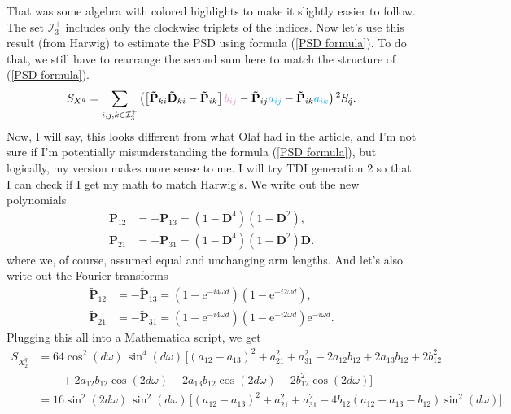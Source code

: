 \documentclass[11pt]{article}
\begin{document}
That was some algebra with  colored highlights to make it slightly easier to follow. The set $\mathcal{I}^+_3$ includes only the clockwise triplets of the indices. Now let's use this result (from Harwig) to estimate the PSD using formula (\ref{PSD formula}). To do that, we still have to rearrange the second sum here to match the structure of (\ref{PSD formula}).
\begin{equation*}
S_{X^q}=\sum_{i,j,k\in\mathcal{I}^+_3}\left(\left[\mathbf{\tilde{P}}_{ki}\mathbf{\tilde{D}}_{ki}-\mathbf{\tilde{P}}_{ik}\right]\color{Lavender}b_{ij}\color{black}-\mathbf{\tilde{P}}_{ij}\color{cyan}a_{ij}\color{black}-\mathbf{\tilde{P}}_{ik}\color{cyan}a_{ik}\color{black}\right)^2S_{\dot{q}}.
\end{equation*}
Now, I will say, this looks different from what Olaf had in the article, and I'm not sure if I'm potentially misunderstanding the formula (\ref{PSD formula}), but logically, my version makes more sense to me. I will try TDI generation 2 so that I can check if I get my math to match Harwig's. We write out the new polynomials 
\begin{align*}
\mathbf{P}_{12} &= -\mathbf{P}_{13} = \left(1-\mathbf{D}^4\right)\left(1-\mathbf{D}^2\right),\\[3pt]
\mathbf{P}_{21} &= -\mathbf{P}_{31} = \left(1-\mathbf{D}^4\right)\left(1-\mathbf{D}^2\right)\mathbf{D}.
\end{align*}
where we, of course, assumed equal and unchanging arm lengths. And let's also write out the Fourier transforms
\begin{align*}
    \tilde{\mathbf{P}}_{12} &= -\tilde{\mathbf{P}}_{13} = \left(1-\mathrm{e}^{-i4\omega d}\right)\left(1-\mathrm{e}^{-i2\omega d}\right),\\[3pt]
    \tilde{\mathbf{P}}_{21} &= -\tilde{\mathbf{P}}_{31} = \left(1-\mathrm{e}^{-i4\omega d}\right)\left(1-\mathrm{e}^{-i2\omega d}\right)\mathrm{e}^{-i\omega d}.
\end{align*}
Plugging this all into a Mathematica script, we get
\begin{align*}
S_{X_2^{\dot q}}
&= 64 \cos^{2}(d\omega)\,\sin^{4}(d\omega)\,
\Big[
   (a_{12}-a_{13})^2
 + a_{21}^{2}
 + a_{31}^{2}
 - 2 a_{12} b_{12}
 + 2 a_{13} b_{12}
 + 2 b_{12}^{2} \\
&\qquad
 + 2 a_{12} b_{12}\cos(2 d\omega)
 - 2 a_{13} b_{12}\cos(2 d\omega)
 - 2 b_{12}^{2}\cos(2 d\omega)
\Big] \\[6pt]
&= 16 \sin^{2}(2d\omega)\,\sin^{2}(d\omega)\,
\Big[
   (a_{12}-a_{13})^2
 + a_{21}^{2}
 + a_{31}^{2}
 - 4 b_{12}\left(a_{12}-a_{13}-b_{12}\right)\sin^{2}(d\omega)
\Big].
\end{align*}
\end{document}
